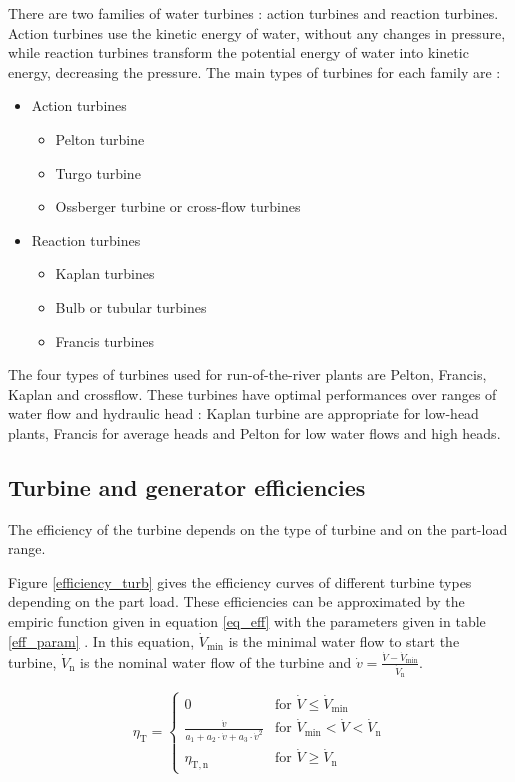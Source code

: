 There are two families of water turbines : action turbines and reaction turbines. Action turbines use the kinetic energy of water, without any changes in pressure, while reaction turbines transform the potential energy of water into kinetic energy, decreasing the pressure. The main types of turbines for each family are \cite{quaschning} :
\begin{itemize}
 \item Action turbines
 \begin{itemize}
  \item Pelton turbine
  \item Turgo turbine
  \item Ossberger turbine or cross-flow turbines
 \end{itemize}
 \item Reaction turbines
 \begin{itemize}
  \item Kaplan turbines
  \item Bulb or tubular turbines
  \item Francis turbines
 \end{itemize}
\end{itemize}

The four types of turbines used for run-of-the-river plants are Pelton, Francis, Kaplan and crossflow. These turbines have optimal performances over ranges of water flow and hydraulic head : Kaplan turbine are appropriate for low-head plants, Francis for average heads and Pelton for low water flows and high heads.   

\subsection{Turbine and generator efficiencies}
\label{eff_turb_gen}
The efficiency of the turbine depends on the type of turbine and on the part-load range\cite{quaschning}\cite{pacer}. 

Figure \ref{efficiency_turb} gives the efficiency curves of different turbine types depending on the part load. These efficiencies can be approximated by the empiric function given in equation \ref{eq_eff} with the parameters given in table \ref{eff_param} \cite{quaschning}. In this equation, $\dot{V}_\mathrm{min}$ is the minimal water flow to start the turbine, $\dot{V}_\mathrm{n}$ is the nominal water flow of the turbine and $\dot{v}=\frac{\dot{V}-\dot{V}_\mathrm{min}}{\dot{V}_\mathrm{n}}$.

\begin{equation}
 \label{eq_eff}
\eta_\mathrm{T}= \left\{
    \begin{array}{ll}
	0 & \mbox{for } \dot{V} \leq \dot{V}_\mathrm{min}\\
        \frac{\dot{v}}{a_\mathrm{1}+a_\mathrm{2} \cdot \dot{v} + a_\mathrm{3} \cdot \dot{v}^2} & \mbox{for } \dot{V}_\mathrm{min}<\dot{V}<\dot{V}_\mathrm{n} \\
        \eta_\mathrm{T,n} & \mbox{for } \dot{V} \geq \dot{V}_\mathrm{n}
    \end{array}
\right.
\end{equation}


